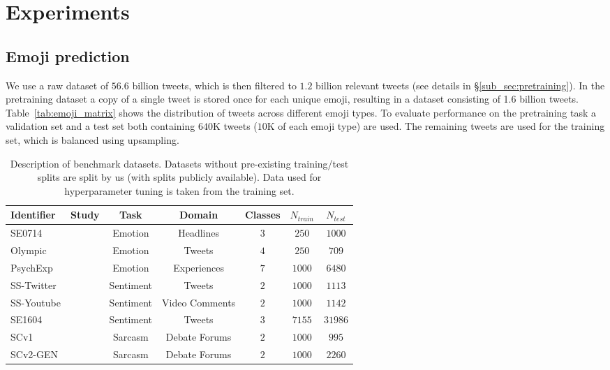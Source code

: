 \documentclass[11pt,a4paper]{article}
\begin{document}
\section{Experiments}
\label{sec:experiments}

\subsection{Emoji prediction}
\label{sub_sec:emoji_prediction}

We use a raw dataset of $56.6$ billion tweets, which is then filtered to $1.2$ billion relevant tweets (see details in \S\ref{sub_sec:pretraining}). In the pretraining dataset a copy of a single tweet is stored once for each unique emoji, resulting in a dataset consisting of 1.6 billion tweets. Table~\ref{tab:emoji_matrix} shows the distribution of tweets across different emoji types. To evaluate performance on the pretraining task a validation set and a test set both containing $640$K tweets ($10$K of each emoji type) are used. The remaining tweets are used for the training set, which is balanced using upsampling.


\begin{table*}[h]
\centering
\small
\caption{Description of benchmark datasets. Datasets without pre-existing training/test splits are split by us (with splits publicly available). Data used for hyperparameter tuning is taken from the training set.}
\label{tab:benchmark_dsets}
\begin{center}
\begin{tabular}{lcccccc}
\toprule
Identifier & Study & Task & Domain & Classes  & $N_{train}$ & $N_{test}$ \\
 \midrule
 SE0714  & \cite{strapparava2007semeval} & Emotion & Headlines & $3$ & $250$ & $1000$ \\
   Olympic  & \cite{sintsova2013fine} & Emotion & Tweets & $4$  & $250$ & $709$ \\
  PsychExp  & \cite{wallbott1986universal} & Emotion & Experiences & $7$ & $1000$ & $6480$ \\
 \midrule
 SS-Twitter  & \cite{thelwall2012sentiment} & Sentiment & Tweets & $2$ &  $1000$ & $1113$ \\
 SS-Youtube  & \cite{thelwall2012sentiment} & Sentiment & Video Comments & $2$ &  $1000$ & $1142$ \\
 SE1604  & \cite{nakov2016semeval} & Sentiment & Tweets & $3$ & $7155$ & $31986$ \\
 \midrule
 SCv1 & \cite{walker2012corpus} & Sarcasm & Debate Forums & $2$ & $1000$ & $995$ \\ SCv2-GEN & \cite{oraby2016creating} & Sarcasm & Debate Forums & $2$ & $1000$ & $2260$ \\ \bottomrule
\end{tabular}
\end{center}
\end{table*}
\end{document}
